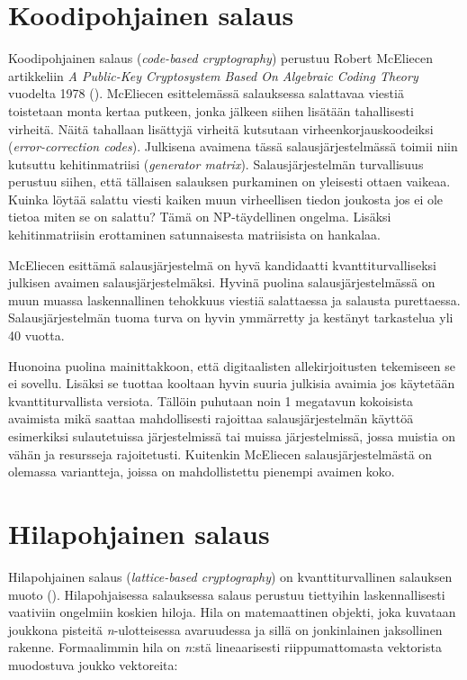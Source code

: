 \section{Koodipohjainen salaus}
Koodipohjainen salaus (\emph{code-based cryptography}) perustuu Robert McEliecen artikkeliin \emph{A Public-Key Cryptosystem Based On Algebraic Coding Theory} vuodelta 1978 (\cite{8012331}). McEliecen esittelemässä salauksessa salattavaa viestiä toistetaan monta kertaa putkeen, jonka jälkeen siihen lisätään tahallisesti virheitä. Näitä tahallaan lisättyjä virheitä kutsutaan virheenkorjauskoodeiksi (\emph{error-correction codes}). Julkisena avaimena tässä salausjärjestelmässä toimii niin kutsuttu kehitinmatriisi (\emph{generator matrix}). Salausjärjestelmän turvallisuus perustuu siihen, että tällaisen salauksen purkaminen on yleisesti ottaen vaikeaa. Kuinka löytää salattu viesti kaiken muun virheellisen tiedon joukosta jos ei ole tietoa miten se on salattu? Tämä on NP-täydellinen ongelma. Lisäksi kehitinmatriisin erottaminen satunnaisesta matriisista on hankalaa.

McEliecen esittämä salausjärjestelmä on hyvä kandidaatti kvanttiturvalliseksi julkisen avaimen salausjärjestelmäksi. Hyvinä puolina salausjärjestelmässä on muun muassa laskennallinen tehokkuus viestiä salattaessa ja salausta purettaessa. Salausjärjestelmän tuoma turva on hyvin ymmärretty ja kestänyt tarkastelua yli 40 vuotta.

Huonoina puolina mainittakkoon, että digitaalisten allekirjoitusten tekemiseen se ei sovellu. Lisäksi se tuottaa kooltaan hyvin suuria julkisia avaimia jos käytetään kvanttiturvallista versiota. Tällöin puhutaan noin 1 megatavun kokoisista avaimista mikä saattaa mahdollisesti rajoittaa salausjärjestelmän käyttöä esimerkiksi sulautetuissa järjestelmissä tai muissa järjestelmissä, jossa muistia on vähän ja resursseja rajoitetusti. Kuitenkin McEliecen salausjärjestelmästä on olemassa variantteja, joissa on mahdollistettu pienempi avaimen koko.


\section{Hilapohjainen salaus}
Hilapohjainen salaus (\emph{lattice-based cryptography}) on kvanttiturvallinen salauksen muoto (\cite{regev2006lattice}). Hilapohjaisessa salauksessa salaus perustuu tiettyihin laskennallisesti vaativiin ongelmiin koskien hiloja. Hila on matemaattinen objekti, joka kuvataan joukkona pisteitä \emph{n}-ulotteisessa avaruudessa ja sillä on jonkinlainen jaksollinen rakenne. Formaalimmin hila on \emph{n}:stä lineaarisesti riippumattomasta vektorista muodostuva joukko vektoreita: 

